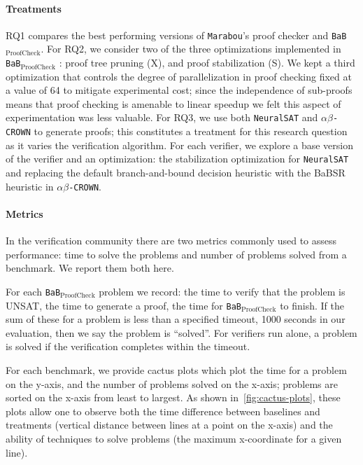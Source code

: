 \documentclass[oneside,11pt,dvipsnames]{book}
\newcommand{\proofcheck}{\texttt{BaB$_{\text{ProofCheck}}$}}
\newcommand{\crown}{\texttt{$\alpha\beta$-CROWN}}
\newcommand{\marabou}{\texttt{Marabou}}
\newcommand{\neuralsat}{\texttt{NeuralSAT}}
\begin{document}
\paragraph{Treatments}
RQ1 compares the best performing versions of \marabou{}'s proof checker and \proofcheck{}.
For RQ2, we consider two of the three optimizations
implemented in \proofcheck{} : proof tree pruning (X), and 
proof stabilization (S).  We kept a third optimization that controls the
degree of parallelization in proof checking fixed at a value of 64 to mitigate
experimental cost; since the independence of sub-proofs means that
proof checking is amenable to linear speedup we felt this aspect of experimentation
was less valuable.
For RQ3, we use both \neuralsat{} and \crown{} to generate proofs; this
constitutes a treatment for this research question as it varies the
verification algorithm.
For each verifier, we explore a base version of the verifier and an optimization:
the stabilization optimization for \neuralsat{} and replacing
the default branch-and-bound decision heuristic with the BaBSR~\cite{bunel2020branch} heuristic
in \crown{}.

\paragraph{Metrics}
In the verification community there are two metrics commonly used to
assess performance: time to solve the problems and number of problems solved
from a benchmark.  We report them both here.

For each \proofcheck{} problem we record:
the time to verify that the problem is UNSAT, the time to generate a proof,
the time for \proofcheck{} to finish.
If the sum of these for a problem is less than a specified timeout,
1000 seconds in our evaluation, then we say the problem is ``solved''.
For verifiers run alone, a problem is solved if the verification completes
within the timeout.

For each benchmark, we provide cactus plots which plot the time for a problem on the y-axis, and the number of problems solved on the x-axis; problems are sorted on the x-axis from least to largest.
As shown in~\autoref{fig:cactus-plots}, these plots allow one to observe both the time difference between baselines and treatments (vertical distance between lines at a point on the x-axis) and the ability of techniques to solve problems (the maximum x-coordinate for a given line).
\end{document}
